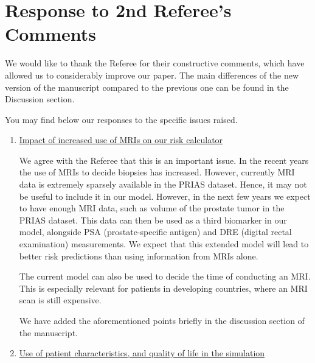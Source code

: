 \clearpage
\section*{Response to 2nd Referee's Comments}
We would like to thank the Referee for their constructive comments, which have allowed us to considerably improve our paper. The main differences of the new version of the manuscript compared to the previous one can be found in the Discussion section.

You may find below our responses to the specific issues raised.

\begin{enumerate}
    \item \underline{Impact of increased use of MRIs on our risk calculator}

    We agree with the Referee that this is an important issue. In the recent years the use of MRIs to decide biopsies has increased. However, currently MRI data is extremely sparsely available in the PRIAS dataset. Hence, it may not be useful to include it in our model. However, in the next few years we expect to have enough MRI data, such as volume of the prostate tumor in the PRIAS dataset. This data can then be used as a third biomarker in our model, alongside PSA (prostate-specific antigen) and DRE (digital rectal examination) measurements. We expect that this extended model will lead to better risk predictions than using information from MRIs alone. 

    The current model can also be used to decide the time of conducting an MRI. This is especially relevant for patients in developing countries, where an MRI scan is still expensive.

    We have added the aforementioned points briefly in the discussion section of the manuscript.

    \item \underline{Use of patient characteristics, and quality of life in the simulation}


\end{enumerate}
